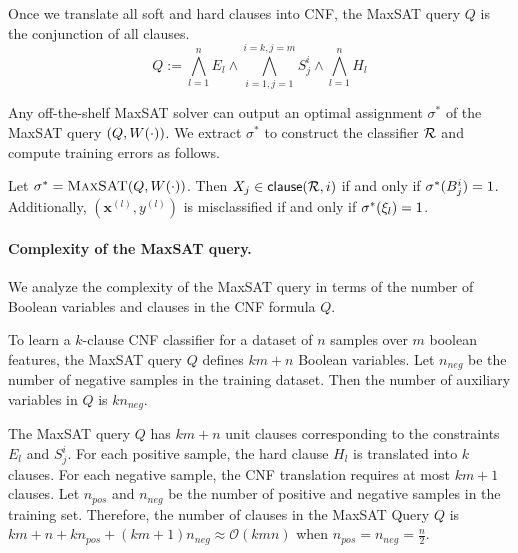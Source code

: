 Once we translate  all soft and hard clauses into CNF, the MaxSAT query $ Q $ is the conjunction of all clauses. 
\[
Q:= \bigwedge_{l=1}^n E_l \wedge  \bigwedge_{i=1,j=1}^{i=k,j=m} S_j^i \wedge \bigwedge_{l=1}^n H_l 
\]
		
Any off-the-shelf MaxSAT solver can output an optimal assignment $ \sigma^* $ of the MaxSAT query $ (Q, W \! \left( \cdot \right)) $. We extract $ \sigma^* $ to construct the classifier $ {\mathcal{R}} $ and compute training errors as follows.
\begin{construction}
	\label{interpretability_imli_construction:rule}
	Let $\sigma^* = \textsc{MaxSAT}(Q,W \! \left( \cdot \right))$. Then $X_j \in {\ensuremath{\mathsf{clause}}(\ensuremath{{\mathcal{R}}},i)}$ if and only if $\sigma^*(B_{j}^{i}) = 1$. Additionally, $ (\mathbf{x}^{(l)}, y^{(l)}) $ is misclassified if and only if $ \sigma^*(\xi_l) = 1 $.
\end{construction}




	
	
	 
\paragraph{Complexity of the MaxSAT query.}

We analyze the complexity of the MaxSAT query in terms of the number of Boolean variables and clauses in the CNF formula $ Q $. 

\begin{proposition}
	\label{interpretability_imli_prop:maxsat_variables}
	 To learn a $ k $-clause CNF classifier for a dataset of  $ n $ samples over $ m $ boolean features, the MaxSAT query $ Q $ defines $ km +n $ Boolean variables. Let $ n_{neg} $ be the number of negative samples in the training dataset. Then the number of auxiliary variables in $ Q $ is  $ kn_{neg}  $.
\end{proposition}


\begin{proposition}
	\label{interpretability_imli_prop:maxsat_clauses}
	The MaxSAT query $ Q $ has $ k m+n $ unit clauses corresponding to the constraints $ E_l $ and $ S_j^i $. For each positive sample, the hard clause $ H_l $ is translated into $ k $  clauses. For each negative sample, the CNF translation requires at most $ k m+1 $ clauses. Let $ n_{pos} $ and $ n_{neg} $ be the number of positive and negative samples in the training set. Therefore, the number of clauses in the MaxSAT Query $ Q $ is $ k m+n+k n_{pos}+(k m+1)n_{neg} \approx \mathcal{O}(k m  n ) $ when $ n_{pos}= n_{neg} =\frac{n}{2} $. 
\end{proposition}

